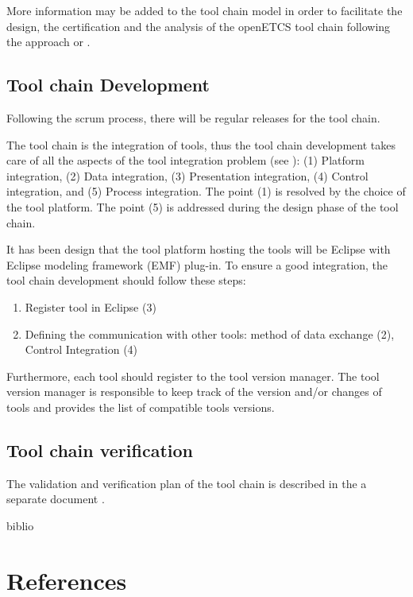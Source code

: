 \documentclass{openetcs_article}
\begin{document}
More information may be added to the tool chain model in
order to facilitate the design, the certification and the analysis  of
the openETCS tool chain following the approach
\cite{slotosch_model-based_2012} or \cite{asplund_towards_2012}.

\subsection{Tool chain Development}
Following the scrum process, there will be regular releases for the tool chain.

The tool chain is the integration of  tools, thus the tool chain development
takes care of all the aspects of the tool integration problem (see  
\cite{wasserman_tool_1990}): (1) Platform integration, (2) Data integration,
(3) Presentation integration, (4) Control integration, and (5) Process
integration.
The point (1) is resolved by the choice of the tool platform. The point (5) is
addressed during the design phase of the tool chain.

It has been design that the tool platform hosting the tools will be
Eclipse with Eclipse modeling framework (\gls{EMF}) plug-in. 
To ensure a good  integration, the tool chain development should follow these steps:
\begin{enumerate}
\item Register tool in Eclipse (3)
\item Defining the communication with other tools: method of data exchange (2),
  Control Integration (4)
\end{enumerate}


Furthermore, each tool should register to the tool version
manager. The tool version manager is responsible to keep track of the
version and/or changes of tools and provides the list of compatible
tools versions. 



\subsection{Tool chain  verification}
The validation and verification plan of the tool chain is described in the
a separate  document \cite{}.



\begin{btSect}{biblio}
\section{References}
\btPrintAll
\end{btSect}


\appendix






\end{document}
